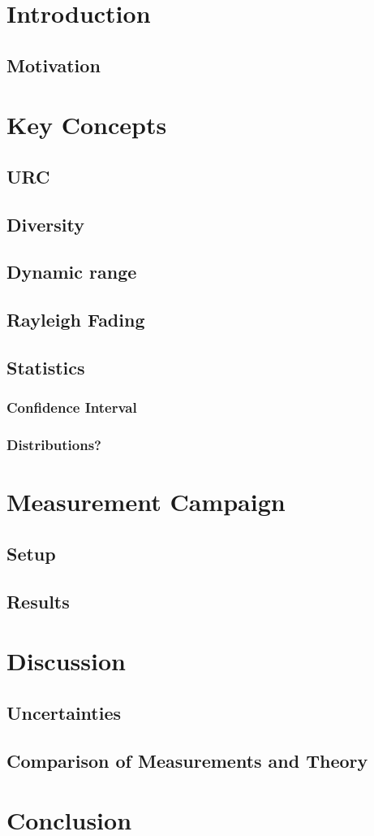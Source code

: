 \chapter{Introduction}
\section{Motivation}


\chapter{Key Concepts}
\section{URC}
\section{Diversity}
\section{Dynamic range}
\section{Rayleigh Fading}
\section{Statistics}
\subsection{Confidence Interval}
\subsection{Distributions?}

\chapter{Measurement Campaign}
\section{Setup}
\section{Results}

\chapter{Discussion}
\section{Uncertainties}
\section{Comparison of Measurements and Theory}

\chapter{Conclusion}




